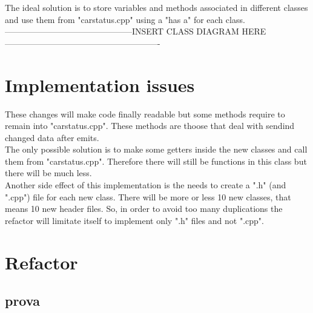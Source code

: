 \documentclass[12pt, letterpaper]{article}
\begin{document}
\begin{flushleft}
\newline
\newline
	The ideal solution is to store variables and methods associated in different classes and use them from "carstatus.cpp" using a "has a" for each class.\\
	---------------------------------------------INSERT CLASS DIAGRAM HERE-------------------------------------------------------

\section{Implementation issues}
	These changes will make code finally readable but some methods require to remain into "carstatus.cpp". These methods are thoose that deal with sendind changed data after emits.\\
	The only possible solution is to make some getters inside the new classes and call them from "carstatus.cpp". Therefore there will still be functions in this class but there will be much less.\\
	Another side effect of this implementation is the needs to create a ".h" (and ".cpp") file for each new class. There will be more or less 10 new classes, that means 10 new header files. So, in order to avoid too many duplications the refactor will limitate itself to implement only ".h" files and not ".cpp".

\section{Refactor}
	\subsection{prova}

\end{flushleft}
\end{document}
